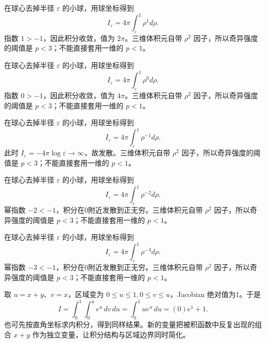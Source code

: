 \documentclass[12pt,fontset=fandol]{ctexart}
\begin{document}
\begin{solve}\label{ans:c40q14}
在球心去掉半径 $\varepsilon$ 的小球，用球坐标得到
\[
I_\varepsilon=4\pi\int_\varepsilon^1\rho^{1}d\rho.
\]
指数 $1>-1$，因此积分收敛，值为 $2\pi$。三维体积元自带 $\rho^2$ 因子，所以奇异强度的阈值是 $p<3$；不能直接套用一维的 $p<1$。
\end{solve}

\begin{solve}\label{ans:c40q15}
在球心去掉半径 $\varepsilon$ 的小球，用球坐标得到
\[
I_\varepsilon=4\pi\int_\varepsilon^1\rho^{0}d\rho.
\]
指数 $0>-1$，因此积分收敛，值为 $4\pi$。三维体积元自带 $\rho^2$ 因子，所以奇异强度的阈值是 $p<3$；不能直接套用一维的 $p<1$。
\end{solve}

\begin{solve}\label{ans:c40q16}
在球心去掉半径 $\varepsilon$ 的小球，用球坐标得到
\[
I_\varepsilon=4\pi\int_\varepsilon^1\rho^{-1}d\rho.
\]
此时 $I_\varepsilon=-4\pi\log\varepsilon\to\infty$，故发散。三维体积元自带 $\rho^2$ 因子，所以奇异强度的阈值是 $p<3$；不能直接套用一维的 $p<1$。
\end{solve}

\begin{solve}\label{ans:c40q17}
在球心去掉半径 $\varepsilon$ 的小球，用球坐标得到
\[
I_\varepsilon=4\pi\int_\varepsilon^1\rho^{-2}d\rho.
\]
幂指数 $-2<-1$，积分在0附近发散到正无穷。三维体积元自带 $\rho^2$ 因子，所以奇异强度的阈值是 $p<3$；不能直接套用一维的 $p<1$。
\end{solve}

\begin{solve}\label{ans:c40q18}
在球心去掉半径 $\varepsilon$ 的小球，用球坐标得到
\[
I_\varepsilon=4\pi\int_\varepsilon^1\rho^{-3}d\rho.
\]
幂指数 $-3<-1$，积分在0附近发散到正无穷。三维体积元自带 $\rho^2$ 因子，所以奇异强度的阈值是 $p<3$；不能直接套用一维的 $p<1$。
\end{solve}

\begin{solve}\label{ans:c40q19}
取 $u=x+y$、$v=x$，区域变为 $0\le u\le 1,0\le v\le u$，Jacobian 绝对值为1。于是
\[
I=\int_0^{1}\int_0^ue^u\,dv\,du=\int_0^{1}ue^u\,du=(0)e^{1}+1.
\]
也可先按直角坐标求内积分，得到同样结果。新的变量把被积函数中反复出现的组合 $x+y$ 作为独立变量，让积分结构与区域边界同时简化。
\end{solve}
\end{document}
